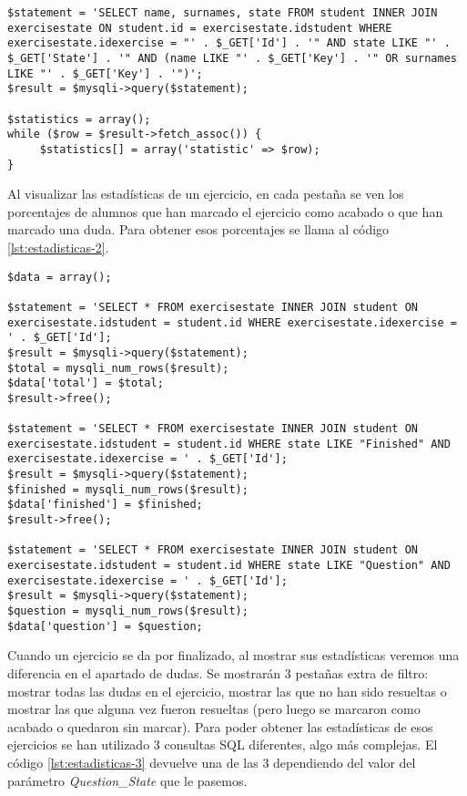 \noindent
\begin{lstlisting}[caption=Obtener estadísticas de un ejercicio.,label={lst:estadisticas}]
$statement = 'SELECT name, surnames, state FROM student INNER JOIN exercisestate ON student.id = exercisestate.idstudent WHERE exercisestate.idexercise = "' . $_GET['Id'] . '" AND state LIKE "' . $_GET['State'] . '" AND (name LIKE "' . $_GET['Key'] . '" OR surnames LIKE "' . $_GET['Key'] . '")';
$result = $mysqli->query($statement);

$statistics = array();
while ($row = $result->fetch_assoc()) {
     $statistics[] = array('statistic' => $row);
}
\end{lstlisting}

Al visualizar las estadísticas de un ejercicio, en cada pestaña se ven los porcentajes de alumnos que han marcado el ejercicio como acabado o que han marcado una duda. Para obtener esos porcentajes se llama al código \ref{lst:estadisticas-2}.\\

\noindent
\begin{lstlisting}[caption=Obtener porcentajes para las estadísticas e un ejercicio.,label={lst:estadisticas-2}]
$data = array();

$statement = 'SELECT * FROM exercisestate INNER JOIN student ON exercisestate.idstudent = student.id WHERE exercisestate.idexercise = ' . $_GET['Id'];
$result = $mysqli->query($statement);
$total = mysqli_num_rows($result);
$data['total'] = $total;
$result->free();
	
$statement = 'SELECT * FROM exercisestate INNER JOIN student ON exercisestate.idstudent = student.id WHERE state LIKE "Finished" AND exercisestate.idexercise = ' . $_GET['Id'];
$result = $mysqli->query($statement);
$finished = mysqli_num_rows($result);
$data['finished'] = $finished;
$result->free();
	
$statement = 'SELECT * FROM exercisestate INNER JOIN student ON exercisestate.idstudent = student.id WHERE state LIKE "Question" AND exercisestate.idexercise = ' . $_GET['Id'];
$result = $mysqli->query($statement);
$question = mysqli_num_rows($result);
$data['question'] = $question;
\end{lstlisting}

Cuando un ejercicio se da por finalizado, al mostrar sus estadísticas veremos una diferencia en el apartado de dudas. Se mostrarán 3 pestañas extra de filtro: mostrar todas las dudas en el ejercicio, mostrar las que no han sido resueltas o mostrar las que alguna vez fueron resueltas (pero luego se marcaron como acabado o quedaron sin marcar). Para poder obtener las estadísticas de esos ejercicios se han utilizado 3 consultas SQL diferentes, algo más complejas. El código \ref{lst:estadisticas-3} devuelve una de las 3 dependiendo del valor del parámetro \textit{Question\_State} que le pasemos.\\

